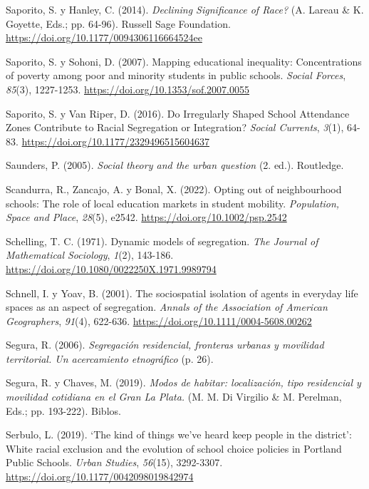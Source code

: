 \documentclass[
  spanish,
  a4paper,%
  chapterprefix=true,%
  DIV=calc,%
  twoside]{scrbook}%
\newlength{\cslhangindent}
\newenvironment{CSLReferences}[2] %
 {\begin{list}{}{%
  \setlength{\itemindent}{0pt}
  \setlength{\leftmargin}{0pt}
  \setlength{\parsep}{0pt}
  \ifodd #1
   \setlength{\leftmargin}{\cslhangindent}
   \setlength{\itemindent}{-1\cslhangindent}
  \fi
  \setlength{\itemsep}{#2\baselineskip}}}
 {\end{list}}
\begin{document}
\begin{CSLReferences}{1}{0}
Saporito, S. y Hanley, C. (2014). \emph{Declining Significance of Race?} (A. Lareau \& K. Goyette, Eds.; pp. 64-96). Russell Sage Foundation. \url{https://doi.org/10.1177/0094306116664524ee}

Saporito, S. y Sohoni, D. (2007). Mapping educational inequality: Concentrations of poverty among poor and minority students in public schools. \emph{Social Forces}, \emph{85}(3), 1227-1253. \url{https://doi.org/10.1353/sof.2007.0055}

Saporito, S. y Van Riper, D. (2016). Do Irregularly Shaped School Attendance Zones Contribute to Racial Segregation or Integration? \emph{Social Currents}, \emph{3}(1), 64-83. \url{https://doi.org/10.1177/2329496515604637}

Saunders, P. (2005). \emph{Social theory and the urban question} (2. ed.). Routledge.

Scandurra, R., Zancajo, A. y Bonal, X. (2022). Opting out of neighbourhood schools: The role of local education markets in student mobility. \emph{Population, Space and Place}, \emph{28}(5), e2542. \url{https://doi.org/10.1002/psp.2542}

Schelling, T. C. (1971). Dynamic models of segregation. \emph{The Journal of Mathematical Sociology}, \emph{1}(2), 143-186. \url{https://doi.org/10.1080/0022250X.1971.9989794}

Schnell, I. y Yoav, B. (2001). The sociospatial isolation of agents in everyday life spaces as an aspect of segregation. \emph{Annals of the Association of American Geographers}, \emph{91}(4), 622-636. \url{https://doi.org/10.1111/0004-5608.00262}

Segura, R. (2006). \emph{Segregación residencial, fronteras urbanas y movilidad territorial. Un acercamiento etnográfico} (p. 26).

Segura, R. y Chaves, M. (2019). \emph{Modos de habitar: localización, tipo residencial y movilidad cotidiana en el Gran La Plata.} (M. M. Di Virgilio \& M. Perelman, Eds.; pp. 193-222). Biblos.

Serbulo, L. (2019). {`}The kind of things we{'}ve heard keep people in the district{'}: White racial exclusion and the evolution of school choice policies in Portland Public Schools. \emph{Urban Studies}, \emph{56}(15), 3292-3307. \url{https://doi.org/10.1177/0042098019842974}


\end{CSLReferences}
\end{document}

